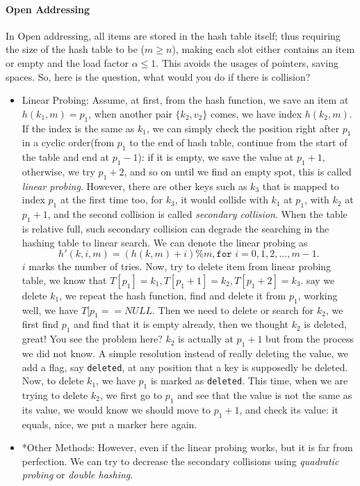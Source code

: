 \documentclass[../main.tex]{subfiles}
\begin{document}
\paragraph{Open Addressing}
In Open addressing,  all items are stored in the hash table itself; thus requiring the size of the hash table to be ($m\ge n$), making each slot either contains an item or empty and the load factor $\alpha\leq1$. This avoids the usages of pointers, saving spaces. So, here is the question, what would you do if there is collision?
\begin{itemize}
    \item Linear Probing: Assume, at first, from the hash function, we save an item at $h(k_1,m)=p_1$, when another pair $\{k_2,v_2\}$ comes, we have index $h(k_2,m)$. If the index is the same as $k_1$, we can simply check the position right after $p_1$ in a cyclic order(from $p_1$ to the end of hash table, continue from the start of the table and end at $p_1-1$): if it is empty, we save the value at $p_1+1$, otherwise, we try $p_1+2$, and so on until we find an empty spot, this is called \textit{linear probing}. However, there are other keys such as $k_3$ that is mapped to index $p_1$ at the first time too, for $k_3$, it would collide with $k_1$ at $p_1$, with $k_2$ at $p_1+1$, and the second collision is called \textit{secondary collision}. When the table is relative full, such secondary collision can degrade the searching in the hashing table to linear search. We can denote the linear probing as
\begin{equation}
    h'(k,i,m)=(h(k,m)+i)\%m, \texttt{for } i=0, 1, 2, ..., m-1.
\end{equation}
$i$ marks the number of tries. Now, try to delete item from linear probing table, we know  that $T[p_1] = k_1, T[p_1+1] = k_2, T[p_1+2] = k_3$.  say we delete $k_1$, we repeat the hash function, find and delete it from $p_1$, working well, we have $T[p_1==NULL$. Then we need to delete or search for $k_2$, we first find $p_1$ and find that it is empty already, then we thought $k_2$ is deleted, great! You see the problem here? $k_2$ is actually at $p_1+1$ but from the process we did not know. A simple resolution instead of really deleting the value, we add a flag, say \texttt{deleted}, at any position that a key is supposedly be deleted. Now, to delete $k_1$, we have $p_1$ is marked as \texttt{deleted}. This time, when we are trying to delete $k_2$, we first go to $p_1$ and see that the value is not the same as its value, we would know we should move to $p_1+1$, and check its value: it equals, nice, we put a marker here again. 

\item *Other Methods: However, even if the linear probing works, but it is far from perfection. We can try to decrease the secondary collisions using \textit{quadratic probing} or \textit{double hashing}.
\end{itemize}
\end{document}
